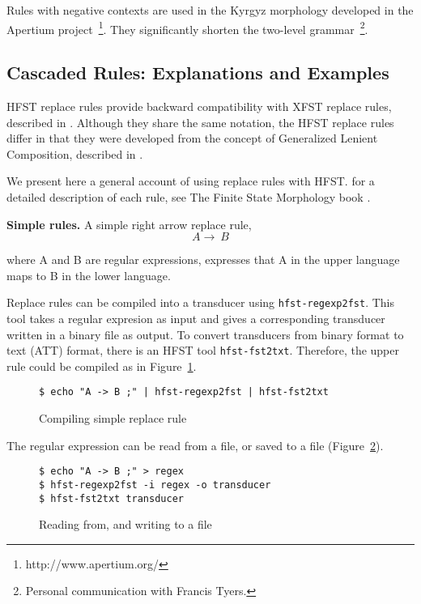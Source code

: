 \documentclass{llncs}
\begin{document}
Rules with negative contexts are used in the Kyrgyz morphology
developed in the Apertium project~\footnote{http://www.apertium.org/}.
They significantly shorten the two-level
grammar~\footnote{Personal communication with Francis Tyers.}.

\subsection{Cascaded Rules: Explanations and Examples}

HFST replace rules provide backward compatibility with XFST replace rules, 
described in \cite{Kempe96parallelreplacement}\cite{beesley/2003}. 
Although they share the same notation, the HFST replace rules differ in that
they were developed from the concept of Generalized Lenient Composition, 
described in \cite{ylijyra/2008b}.

We present here a general account of using replace rules with HFST.
for a detailed description of each rule, see
The Finite State Morphology book \cite{beesley/2003}.


\textbf{Simple rules.} A simple right arrow replace rule,
\begin{equation}
  A \rightarrow\ B
\end{equation}

where A and B are regular expressions, 
expresses that A in the upper language maps to B in the lower language.

Replace rules can be compiled into a transducer using
\verb!hfst-regexp2fst!. This tool takes a regular expresion as input 
and gives a corresponding transducer written in a binary file as output. 
To convert transducers from binary format to text (ATT) format, 
there is an HFST tool \verb!hfst-fst2txt!. Therefore, the upper rule 
could be compiled as in Figure~\ref{fig:simple_replace}.

\begin{figure} [h!]
{\footnotesize
\begin{verbatim}
$ echo "A -> B ;" | hfst-regexp2fst | hfst-fst2txt
\end{verbatim}
}
\caption{Compiling simple replace rule}
\label{fig:simple_replace}
\end{figure}


The regular expression can be read from a file, or saved to a file (Figure~\ref{fig:read_from_file}). 

\begin{figure} [h!]
{\footnotesize
\begin{verbatim}
$ echo "A -> B ;" > regex
$ hfst-regexp2fst -i regex -o transducer
$ hfst-fst2txt transducer
\end{verbatim}
}
\caption{Reading from, and writing to a file}
\label{fig:read_from_file}
\end{figure}
\end{document}
